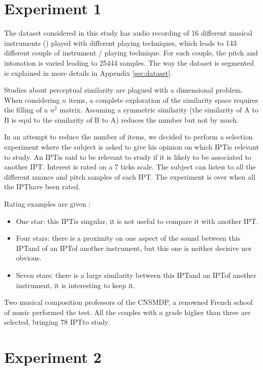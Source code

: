 \documentclass{article}
\newcommand{\ipt}{IPT}
\begin{document}
\section{Experiment 1}\label{sec:xp1}

The dataset considered in this study has audio recording of 16 different  musical instruments () played with different playing techniques, which leads to 143 different couple of instrument / playing technique. For each couple, the pitch and intonation is varied leading to 25444 samples. The way the dataset is segmented is explained in more details in Appendix \ref{sec:dataset}.

Studies about perceptual similarity are plagued with a dimensional problem. When considering $n$ items, a complete exploration of the similarity space requires the filling of a $n^2$ matrix. Assuming a symmetric similarity (the similarity of A to B is equl to the similarity of B to A) reduces the number but not by much.

In an attempt to reduce the number of items, we decided to perform a selection experiment where the subject is asked to give his opinion on which \ipt is relevant to study. An \ipt is said to be relevant to study if it is likely to be associated to another \ipt. Interest is rated on a 7 ticks scale. The subject can listen to all the different nuance and pitch samples of each \ipt. The experiment is over when all the \ipt have been rated.

Rating examples are given :
\begin{itemize}
  \item One star: this \ipt is singular, it is not useful to compare it with another \ipt.
  \item Four stars: there is a proximity on one aspect of the sound between this \ipt and of an \ipt of another instrument, but this one is neither decisive nor obvious.
  \item Seven stars: there is a large similarity between this \ipt and an \ipt of another instrument, it is interesting to keep it.
\end{itemize}

Two musical composition professors of the CNSMDP, a renowned French school of music performed the test. All the couples with a grade higher than three are selected, bringing 78 \ipt to study.

\section{Experiment 2}\label{sec:xp2}
\end{document}
